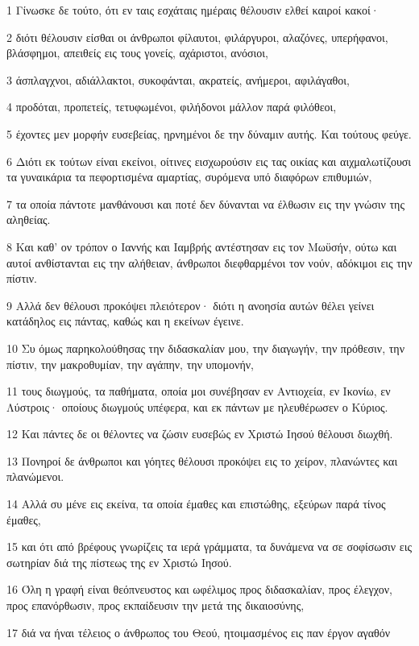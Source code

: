 \par 1 Γίνωσκε δε τούτο, ότι εν ταις εσχάταις ημέραις θέλουσιν ελθεί καιροί κακοί·
\par 2 διότι θέλουσιν είσθαι οι άνθρωποι φίλαυτοι, φιλάργυροι, αλαζόνες, υπερήφανοι, βλάσφημοι, απειθείς εις τους γονείς, αχάριστοι, ανόσιοι,
\par 3 άσπλαγχνοι, αδιάλλακτοι, συκοφάνται, ακρατείς, ανήμεροι, αφιλάγαθοι,
\par 4 προδόται, προπετείς, τετυφωμένοι, φιλήδονοι μάλλον παρά φιλόθεοι,
\par 5 έχοντες μεν μορφήν ευσεβείας, ηρνημένοι δε την δύναμιν αυτής. Και τούτους φεύγε.
\par 6 Διότι εκ τούτων είναι εκείνοι, οίτινες εισχωρούσιν εις τας οικίας και αιχμαλωτίζουσι τα γυναικάρια τα πεφορτισμένα αμαρτίας, συρόμενα υπό διαφόρων επιθυμιών,
\par 7 τα οποία πάντοτε μανθάνουσι και ποτέ δεν δύνανται να έλθωσιν εις την γνώσιν της αληθείας.
\par 8 Και καθ' ον τρόπον ο Ιαννής και Ιαμβρής αντέστησαν εις τον Μωϋσήν, ούτω και αυτοί ανθίστανται εις την αλήθειαν, άνθρωποι διεφθαρμένοι τον νούν, αδόκιμοι εις την πίστιν.
\par 9 Αλλά δεν θέλουσι προκόψει πλειότερον· διότι η ανοησία αυτών θέλει γείνει κατάδηλος εις πάντας, καθώς και η εκείνων έγεινε.
\par 10 Συ όμως παρηκολούθησας την διδασκαλίαν μου, την διαγωγήν, την πρόθεσιν, την πίστιν, την μακροθυμίαν, την αγάπην, την υπομονήν,
\par 11 τους διωγμούς, τα παθήματα, οποία μοι συνέβησαν εν Αντιοχεία, εν Ικονίω, εν Λύστροις· οποίους διωγμούς υπέφερα, και εκ πάντων με ηλευθέρωσεν ο Κύριος.
\par 12 Και πάντες δε οι θέλοντες να ζώσιν ευσεβώς εν Χριστώ Ιησού θέλουσι διωχθή.
\par 13 Πονηροί δε άνθρωποι και γόητες θέλουσι προκόψει εις το χείρον, πλανώντες και πλανώμενοι.
\par 14 Αλλά συ μένε εις εκείνα, τα οποία έμαθες και επιστώθης, εξεύρων παρά τίνος έμαθες,
\par 15 και ότι από βρέφους γνωρίζεις τα ιερά γράμματα, τα δυνάμενα να σε σοφίσωσιν εις σωτηρίαν διά της πίστεως της εν Χριστώ Ιησού.
\par 16 Όλη η γραφή είναι θεόπνευστος και ωφέλιμος προς διδασκαλίαν, προς έλεγχον, προς επανόρθωσιν, προς εκπαίδευσιν την μετά της δικαιοσύνης,
\par 17 διά να ήναι τέλειος ο άνθρωπος του Θεού, ητοιμασμένος εις παν έργον αγαθόν


